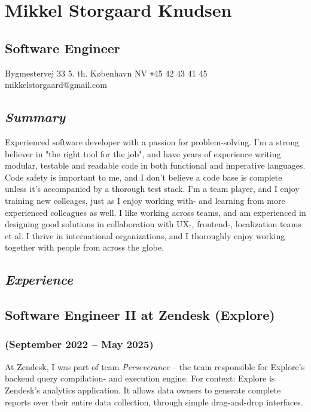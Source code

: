 \documentclass[10pt, a4paper]{article}
\begin{document}
\section*{Mikkel Storgaard Knudsen}
\subsection*{Software Engineer}
Bygmestervej 33 5. th.  København NV \newline
\texttt{+}45 42 43 41 45 \newline
mikkelstorgaard@gmail.com
\subsection*{\textit{Summary}}
Experienced software developer with a passion for problem-solving. I'm a strong believer in "the right tool for the job", and have years of experience writing modular, testable and readable code in both functional and imperative languages.\newline
Code safety is important to me, and I don't believe a code base is complete unless it's accompanied by a thorough test stack.
I'm a team player, and I enjoy training new colleages, just as I enjoy working with- and learning from more experienced colleagues as well.
I like working across teams, and am experienced in designing good solutions in collaboration with UX-, frontend-, localization teams et al.
I thrive in international organizations, and I thoroughly enjoy working together with people from across the globe.

\subsection*{\textit{Experience}}
\subsection*{Software Engineer II at Zendesk (Explore)}
\subsubsection*{{\normalfont(September 2022 -- May 2025)}}
At Zendesk, I was part of team \textit{Perseverance} -- the team responsible for Explore's backend query compilation- and execution engine. 
For context: Explore is Zendesk's analytics application. It allows data owners to generate complete reports over their entire data collection, through simple drag-and-drop interfaces.
\end{document}
